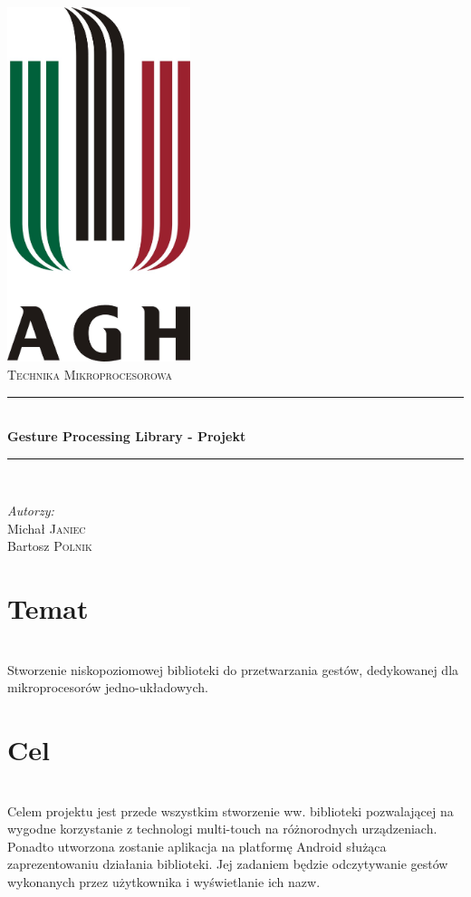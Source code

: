 \documentclass[a4paper,12pt]{article}
\newcommand{\HRule}{\rule{\linewidth}{0.5mm}}
\begin{document}
\begin{titlepage}
	\begin{center}
		\includegraphics[width=0.4\textwidth]{data/logo.jpg} \\[1cm]
		\textsc{\LARGE Technika Mikroprocesorowa} \\[0.8cm]
		\HRule \\[0.4cm]
		{ \huge \bfseries Gesture Processing Library - Projekt} \\[0.4cm] 
		\HRule \\[1.5cm]
	\end{center}
	\begin{minipage}{0.4\textwidth}
		\begin{flushleft} \large
		\emph{Autorzy:} \\
		Michał \textsc{Janiec} \\
		Bartosz \textsc{Polnik}
		\end{flushleft}
	\end{minipage}
\end{titlepage}
\thispagestyle{empty}



\section{\Large Temat} \ \\[0.1cm]
\indent Stworzenie niskopoziomowej biblioteki do przetwarzania gestów, dedykowanej dla mikroprocesorów jedno-układowych.

\section{\Large Cel} \ \\[0.1cm]
\indent Celem projektu jest przede wszystkim stworzenie ww. biblioteki pozwalającej na wygodne korzystanie z technologi multi-touch na różnorodnych urządzeniach. Ponadto utworzona zostanie aplikacja na platformę Android służąca zaprezentowaniu działania biblioteki. Jej zadaniem będzie odczytywanie gestów wykonanych przez użytkownika i wyświetlanie ich nazw.
\end{document}

